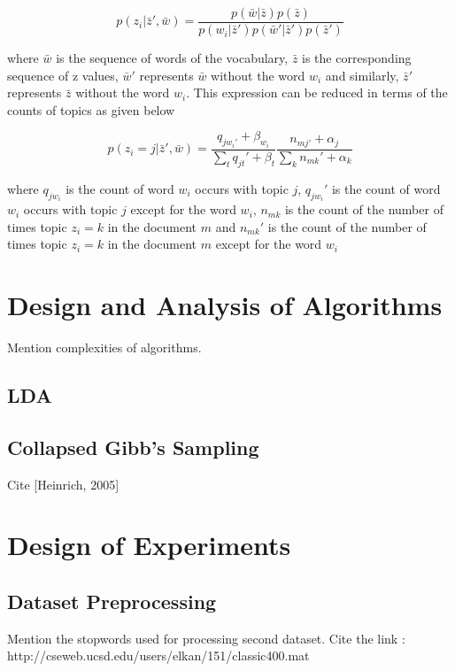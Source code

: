 \documentclass[11pt,a4paper,oneside]{article}
\begin{document}
\begin{equation}
p(z_i|\bar{z}', \bar{w}) = \frac{p(\bar{w} | \bar{z}) p(\bar{z})}{p(w_i|\bar{z}')p(\bar{w}'|\bar{z}')p(\bar{z}')}
\end{equation}

where $\bar{w}$ is the sequence of words of the vocabulary, $\bar{z}$ is the corresponding sequence of z values, $\bar{w}'$ represents $\bar{w}$ without the word $w_i$ and similarly, $\bar{z}'$ represents $\bar{z}$ without the word $w_i$. This expression can be reduced in terms of the counts of topics as given below

\begin{equation}
p(z_i = j | \bar{z}', \bar{w}) = \frac{q_{j w_{i}'} + \beta_{w_i}}{\sum_t{q_{jt}' + \beta_t}}\frac{n_{mj'} + \alpha_j}{\sum_k{n_{mk}' + \alpha_k}}
\end{equation}

where $q_{j w_i}$ is the count of word $w_i$ occurs with topic $j$, $q_{j w_i}'$ is the count of word $w_i$ occurs with topic $j$ except for the word $w_i$, $n_{mk}$ is the count of the number of times topic $z_i = k$ in the document $m$ and $n_{mk}'$ is the count of the number of times topic $z_i = k$ in the document $m$ except for the word $w_i$ 

\section{Design and Analysis of Algorithms}

\label{sec:Algorithms}
Mention complexities of algorithms.

\subsection{LDA}

\subsection{Collapsed Gibb's Sampling}
Cite [Heinrich, 2005]

\section{Design of Experiments}
\label{sec:Experiments}

\subsection{Dataset Preprocessing}
Mention the stopwords used for processing second dataset.
Cite the link : http://cseweb.ucsd.edu/users/elkan/151/classic400.mat
\end{document}

